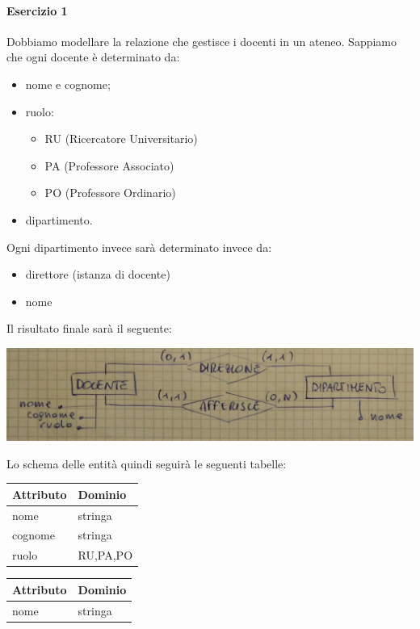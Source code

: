 \paragraph{Esercizio 1}
Dobbiamo modellare la relazione che gestisce i docenti in un ateneo. Sappiamo che ogni docente è determinato da:
\begin{itemize}
    \item nome e cognome;
    \item ruolo:
    \begin{itemize}
        \item RU (Ricercatore Universitario)
        \item PA (Professore Associato)
        \item PO (Professore Ordinario)
    \end{itemize}
    \item dipartimento.
\end{itemize}
Ogni dipartimento invece sarà determinato invece da:
\begin{itemize}
    \item direttore (istanza di docente)
    \item nome
\end{itemize}
Il risultato finale sarà il seguente:
\begin{center}
    \includegraphics[width=.7\textwidth]{res/er-docente-dipartimento.jpg} \hfill
\end{center}
Lo schema delle entità quindi seguirà le seguenti tabelle: \\
\begin{minipage}[t]{0.5\textwidth}
    \begin{center}
        \begin{tabular}{|l|l|}
            \hline
            \textbf{Attributo} & \textbf{Dominio} \\ \hline
            nome        & stringa       \\ \hline
            cognome     & stringa       \\ \hline
            ruolo       & {RU,PA,PO}    \\ \hline
        \end{tabular}
    \end{center}
\end{minipage}
\begin{minipage}[t]{0.5\textwidth}
    \begin{center}
        \begin{tabular}{|l|l|}
            \hline
            \textbf{Attributo} & \textbf{Dominio} \\ \hline
            nome        & stringa       \\ \hline
        \end{tabular}
    \end{center}
\end{minipage}

